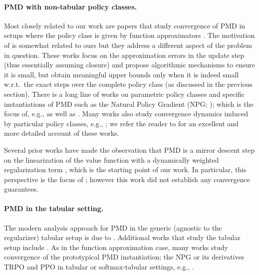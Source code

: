 \paragraph{PMD with non-tabular policy classes.} Most closely related to our work are papers that study convergence of PMD in setups where the policy class is given by function approximators \citep{vaswani22ageneral,ju2022policy,grudzien2022mirror,alfano2023novel,xiong2024dual}. 
The motivation of \citet{alfano2023novel,xiong2024dual} is somewhat related to ours but they address a different aspect of the problem in question. These works focus on the approximation errors in the update step (thus essentially assuming closure) and propose algorithmic mechanisms to ensure it is small, but obtain meaningful upper bounds only when it is indeed small w.r.t.~the exact steps over the complete policy class (as discussed in the previous section). 
There is a long line of works on parametric policy classes and specific instantiations of PMD such as the Natural Policy Gradient (NPG; \citealp{kakade2001natural}); which is the focus of, e.g., \citet{alfano2022linear,yuan2023loglinear,cayci2024convergence} as well as \citet{agarwal2021theory}. Many works also study convergence dynamics induced by particular policy classes, e.g., \citet{liu2019neural,wang2020neural,liu2020improved}; we refer the reader to \citet{alfano2023novel} for an excellent and more detailed account of these works.

Several prior works have made the observation that PMD is a mirror descent step on the linearization of the value function with a dynamically weighted regularization term \citep{shani2020adaptive,tomar2020mirror,vaswani22ageneral,xiao2022convergence}, which is the starting point of our work. In particular, this perspective is the focus of \citet{vaswani22ageneral}; however this work did not establish any convergence guarantees.

\paragraph{PMD in the tabular setting.}
The modern analysis approach for PMD in the generic (agnostic to the regularizer) tabular setup is due to \citet{xiao2022convergence}. Additional works that study the tabular setup include \citet{geist2019theory,lan2023policy,johnson2023optimal,zhan2023policy}.
As in the function approximation case, many works study convergence of the prototypical PMD instantiation; the NPG or its derivatives TRPO \citep{schulman2015trust} and PPO \citep{schulman2017proximal} in tabular or softmax-tabular settings, e.g., \citet{agarwal2021theory,shani2020adaptive,cen2022fast,bhandari2021linear, khodadadian2021linear, khodadadian2022linear}.



